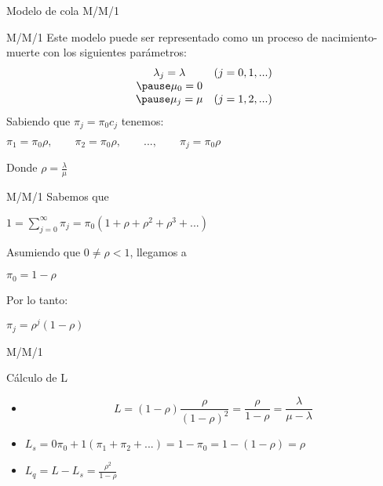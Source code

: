 \begin{frame}
	\centering \LARGE \color{naranjaUCA} Modelo de cola M/M/1
\end{frame}
\begin{frame}{M/M/1}
	   Este modelo puede ser representado como un proceso  de nacimiento-muerte con los siguientes parámetros: \pause
		$$\begin{array}{cc}
		\lambda_j=\lambda & (j=0,1,...)\\ \pause
		\mu_0=0 &  \\ \pause
		\mu_j=\mu &  (j=1,2,...)\\
		\end{array}$$ \pause
		Sabiendo que $\pi_j=\pi_0 c_j$ tenemos: \pause
			\begin{center}
				$\pi_1=\pi_0\rho, \qquad \pi_2=\pi_0\rho, \qquad...,\qquad\pi_j=\pi_0\rho$
				
			\end{center} \pause
			\hspace{0.5cm}Donde $\rho=\frac{\lambda}{\mu}$
\end{frame}
\begin{frame}{M/M/1}
		Sabemos que 
			\begin{center}
			$1=\sum_{j=0}^{\infty}\pi_j=\pi_0(1+ \rho +\rho^2+\rho^3+...)$
		\end{center} \pause
		Asumiendo que $0\neq\rho<1$, llegamos a \pause
		\\ 	\begin{center}
			$\pi_0=1-\rho$
		\end{center}
		\pause
		Por lo tanto: \pause
		\begin{center}
			$\pi_j=\rho^j(1-\rho)$
		\end{center}
\end{frame}
\begin{frame}{M/M/1}
	\begin{block}{Cálculo de L}
	\begin{itemize}
		\item
		\begin{equation}
		L=(1-\rho)\frac{\rho}{(1-\rho)^2}=\frac{\rho}{1-\rho}=\frac{\lambda}{\mu-\lambda}
		\end{equation} \pause
		\item
			\begin{center}
				$L_s=0\pi_0+1(\pi_1+\pi_2+...)=1-\pi_0=1-(1-\rho)=\rho$
			\end{center} \pause
			\item
				\begin{center}
					$L_q=L-L_s=\frac{\rho^2}{1-\rho}$
				\end{center}
				\end{itemize}
		
	\end{block}
	
\end{frame}
